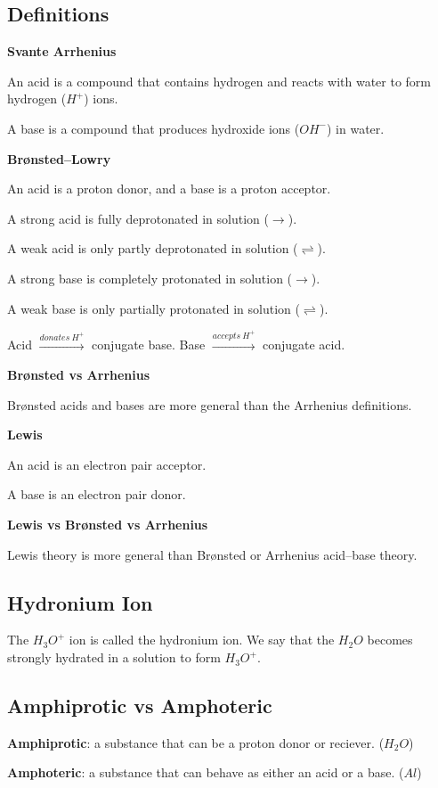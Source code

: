 \documentclass[a4paper,12pt]{article}
\begin{document}
\subsection{Definitions}
\textbf{Svante Arrhenius}\par
An acid is a compound that contains hydrogen and reacts with water to form hydrogen ($H^{+}$) ions.\par
A base is a compound that produces hydroxide ions ($OH^{-}$) in water.\par
\textbf{Brønsted–Lowry}\par
An acid is a proton donor, and a base is a proton acceptor.\par
A strong acid is fully deprotonated in solution ($\rightarrow$).\par
A weak acid is only partly deprotonated in solution ($\rightleftharpoons$).\par
A strong base is completely protonated in solution ($\rightarrow$).\par
A weak base is only partially protonated in solution ($\rightleftharpoons$).\par
Acid $\xrightarrow{donates\ H^{+}}$ conjugate base. Base $\xrightarrow{accepts\ H^{+}}$ conjugate acid.\par
\textbf{Brønsted vs Arrhenius}\par
Brønsted acids and bases are more general than the Arrhenius definitions.\par
\textbf{Lewis}\par
An acid is an electron pair acceptor.\par
A base is an electron pair donor.\par
\textbf{Lewis vs Brønsted vs Arrhenius}\par
Lewis theory is more general than Brønsted or Arrhenius acid–base theory.
\subsection{Hydronium Ion}
The $H_{3}O^{+}$ ion is called the hydronium ion. We say that the $H_{2}O$ becomes strongly hydrated in a solution to form $H_{3}O^{+}$.
\subsection{Amphiprotic vs Amphoteric}
\textbf{Amphiprotic}: a substance that can be a proton donor or reciever. ($H_{2}O$)\par
\textbf{Amphoteric}: a substance that can behave as either an acid or a base. ($Al$)\par
\end{document}
